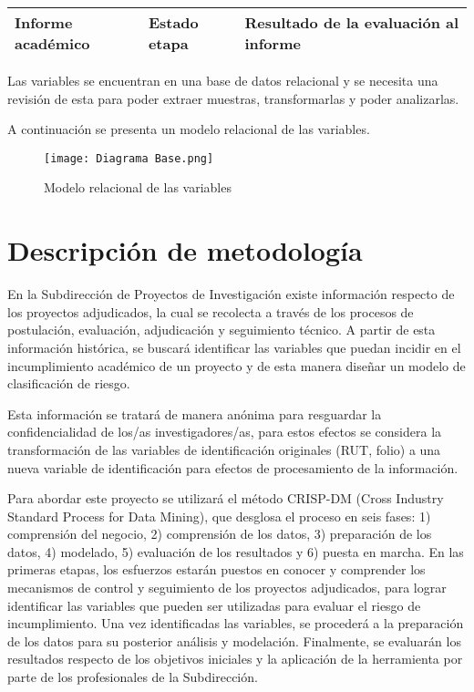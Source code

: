 \documentclass[
]{article}
\begin{document}
\begin{table}[h!]
\begin{tabular}{|p{5cm}|p{4.5cm}|p{6cm}|}
         Informe académico & Estado etapa & Resultado de la evaluación al informe \\
         
         \hline
    \end{tabular}
    \label{tab:my_label}
\end{table}

\newpage

\noindent Las variables se encuentran en una base de datos relacional y
se necesita una revisión de esta para poder extraer muestras,
transformarlas y poder analizarlas.

\vspace{3mm}

\noindent A continuación se presenta un modelo relacional de las
variables.

\begin{figure}[H]
    \centering
    \texttt{[image: Diagrama Base.png]}
    \caption{Modelo relacional de las variables}
    \label{fig:modelo relacional}
\end{figure}

\section{Descripción de metodología}

En la Subdirección de Proyectos de Investigación existe información
respecto de los proyectos adjudicados, la cual se recolecta a través de
los procesos de postulación, evaluación, adjudicación y seguimiento
técnico. A partir de esta información histórica, se buscará identificar
las variables que puedan incidir en el incumplimiento académico de un
proyecto y de esta manera diseñar un modelo de clasificación de riesgo.

\vspace{3mm}

\noindent Esta información se tratará de manera anónima para resguardar
la confidencialidad de los/as investigadores/as, para estos efectos se
considera la transformación de las variables de identificación
originales (RUT, folio) a una nueva variable de identificación para
efectos de procesamiento de la información.

\vspace{3mm}

\noindent Para abordar este proyecto se utilizará el método CRISP-DM
(Cross Industry Standard Process for Data Mining), que desglosa el
proceso en seis fases: 1) comprensión del negocio, 2) comprensión de los
datos, 3) preparación de los datos, 4) modelado, 5) evaluación de los
resultados y 6) puesta en marcha. En las primeras etapas, los esfuerzos
estarán puestos en conocer y comprender los mecanismos de control y
seguimiento de los proyectos adjudicados, para lograr identificar las
variables que pueden ser utilizadas para evaluar el riesgo de
incumplimiento. Una vez identificadas las variables, se procederá a la
preparación de los datos para su posterior análisis y modelación.
Finalmente, se evaluarán los resultados respecto de los objetivos
iniciales y la aplicación de la herramienta por parte de los
profesionales de la Subdirección.
\end{document}
